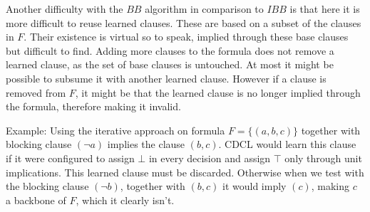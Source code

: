 Another difficulty with the $BB$ algorithm in comparison to $IBB$ is that here it is more difficult to reuse learned clauses. These are based on a subset of the clauses in $F$. Their existence is virtual so to speak, implied through these base clauses but difficult to find. Adding more clauses to the formula does not remove a learned clause, as the set of base clauses is untouched. At most it might be possible to subsume it with another learned clause. However if a clause is removed from $F$, it might be that the learned clause is no longer implied through the formula, therefore making it invalid. 


Example: Using the iterative approach on formula $F = \{(a,b,c)\}$ together with blocking clause $(\neg a)$ implies the clause $(b,c)$. CDCL would learn this clause if it were configured to assign $\bot$ in every decision and assign $\top$ only through unit implications. This learned clause must be discarded. Otherwise when we test with the blocking clause $(\neg b)$, together with $(b,c)$ it would imply $(c)$, making $c$ a backbone of $F$, which it clearly isn't.


